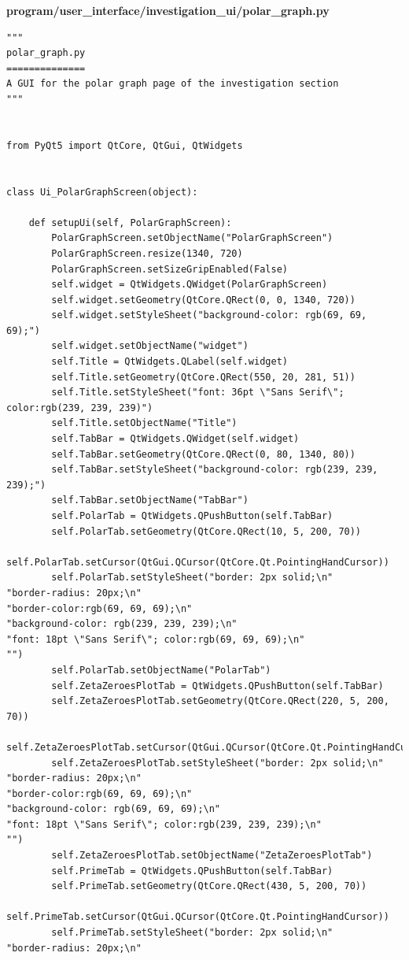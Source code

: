 \documentclass[12pt]{article}
\begin{document}
\textbf{program/user\_interface/investigation\_ui/polar\_graph.py}
\begin{lstlisting}
"""
polar_graph.py
==============
A GUI for the polar graph page of the investigation section
"""


from PyQt5 import QtCore, QtGui, QtWidgets


class Ui_PolarGraphScreen(object):

    def setupUi(self, PolarGraphScreen):
        PolarGraphScreen.setObjectName("PolarGraphScreen")
        PolarGraphScreen.resize(1340, 720)
        PolarGraphScreen.setSizeGripEnabled(False)
        self.widget = QtWidgets.QWidget(PolarGraphScreen)
        self.widget.setGeometry(QtCore.QRect(0, 0, 1340, 720))
        self.widget.setStyleSheet("background-color: rgb(69, 69, 69);")
        self.widget.setObjectName("widget")
        self.Title = QtWidgets.QLabel(self.widget)
        self.Title.setGeometry(QtCore.QRect(550, 20, 281, 51))
        self.Title.setStyleSheet("font: 36pt \"Sans Serif\"; color:rgb(239, 239, 239)")
        self.Title.setObjectName("Title")
        self.TabBar = QtWidgets.QWidget(self.widget)
        self.TabBar.setGeometry(QtCore.QRect(0, 80, 1340, 80))
        self.TabBar.setStyleSheet("background-color: rgb(239, 239, 239);")
        self.TabBar.setObjectName("TabBar")
        self.PolarTab = QtWidgets.QPushButton(self.TabBar)
        self.PolarTab.setGeometry(QtCore.QRect(10, 5, 200, 70))
        self.PolarTab.setCursor(QtGui.QCursor(QtCore.Qt.PointingHandCursor))
        self.PolarTab.setStyleSheet("border: 2px solid;\n"
"border-radius: 20px;\n"
"border-color:rgb(69, 69, 69);\n"
"background-color: rgb(239, 239, 239);\n"
"font: 18pt \"Sans Serif\"; color:rgb(69, 69, 69);\n"
"")
        self.PolarTab.setObjectName("PolarTab")
        self.ZetaZeroesPlotTab = QtWidgets.QPushButton(self.TabBar)
        self.ZetaZeroesPlotTab.setGeometry(QtCore.QRect(220, 5, 200, 70))
        self.ZetaZeroesPlotTab.setCursor(QtGui.QCursor(QtCore.Qt.PointingHandCursor))
        self.ZetaZeroesPlotTab.setStyleSheet("border: 2px solid;\n"
"border-radius: 20px;\n"
"border-color:rgb(69, 69, 69);\n"
"background-color: rgb(69, 69, 69);\n"
"font: 18pt \"Sans Serif\"; color:rgb(239, 239, 239);\n"
"")
        self.ZetaZeroesPlotTab.setObjectName("ZetaZeroesPlotTab")
        self.PrimeTab = QtWidgets.QPushButton(self.TabBar)
        self.PrimeTab.setGeometry(QtCore.QRect(430, 5, 200, 70))
        self.PrimeTab.setCursor(QtGui.QCursor(QtCore.Qt.PointingHandCursor))
        self.PrimeTab.setStyleSheet("border: 2px solid;\n"
"border-radius: 20px;\n"

\end{lstlisting}
\end{document}
